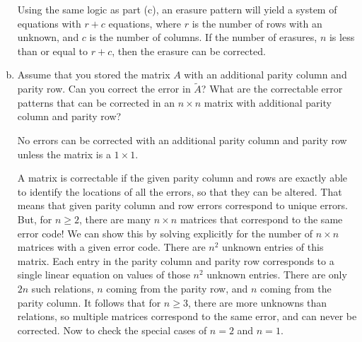 \documentclass{article}
\begin{document}
\begin{enumerate}[(a)]
    \vspace{5mm}

    Using the same logic as part (c), an erasure pattern will yield a system
    of equations with $r+c$ equations, where $r$ is the number of rows with
    an unknown, and $c$ is the number of columns. If the number of erasures,
    $n$ is less than or equal to $r+c$, then the erasure can be corrected.
  \item
    Assume that you stored the matrix $A$ with an additional parity column and
    parity row. Can you correct the error in $\tilde{A}$? What are the
    correctable error patterns that can be corrected in an $n \times n$ matrix
    with additional parity column and parity row?

    \vspace{5mm}

    No errors can be corrected with an additional parity column and parity row
    unless the matrix is a $1 \times 1$.

    \vspace{5mm}

    A matrix is correctable if the given parity column and rows are exactly
    able to identify the locations of all the errors, so that they can be
    altered. That means that given parity column and row errors correspond to
    unique errors. But, for $n \geq 2$, there are many $n \times n$ matrices
    that correspond to the same error code! We can show this by solving
    explicitly for the number of $n \times n$ matrices with a given error
    code. There are $n^2$ unknown entries of this matrix. Each entry in the
    parity column and parity row corresponds to a single linear equation on
    values of those $n^2$ unknown entries. There are only $2n$ such relations,
    $n$ coming from the parity row, and $n$ coming from the parity column. It
    follows that for $n \geq 3$, there are more unknowns than relations, so
    multiple matrices correspond to the same error, and can never be
    corrected. Now to check the special cases of $n = 2$ and $n = 1$.

    \vspace{5mm}


\end{enumerate}
\end{document}
